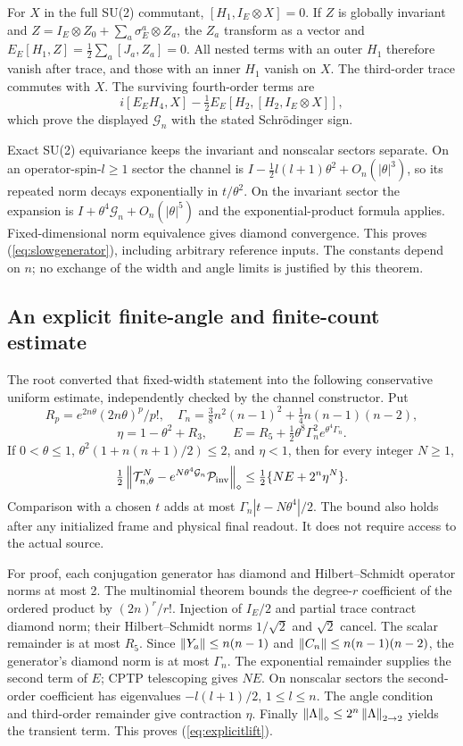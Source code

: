 For $X$ in the full SU(2) commutant, $[H_1,I_E\otimes X]=0$. If $Z$ is
globally invariant and $Z=I_E\otimes Z_0+\sum_a\sigma_E^a\otimes Z_a$,
the $Z_a$ transform as a vector and
$E_E[H_1,Z]=\tfrac12\sum_a[J_a,Z_a]=0$.
All nested terms with an outer $H_1$ therefore vanish after trace, and
those with an inner $H_1$ vanish on $X$. The third-order trace commutes with
$X$. The surviving fourth-order terms are
\[
 i[E_EH_4,X]-\tfrac12E_E[H_2,[H_2,I_E\otimes X]],
\]
which prove the displayed $\mathcal G_n$ with the stated Schr\"odinger sign.

Exact SU(2) equivariance keeps the invariant and nonscalar sectors separate.
On an operator-spin-$l\ge1$ sector the channel is
$I-\tfrac12l(l+1)\theta^2+O_n(|\theta|^3)$, so its repeated norm decays
exponentially in $t/\theta^2$. On the invariant sector the expansion is
$I+\theta^4\mathcal G_n+O_n(|\theta|^5)$ and the exponential-product
formula applies. Fixed-dimensional norm equivalence gives diamond convergence.
This proves (\ref{eq:slowgenerator}), including arbitrary reference inputs.
The constants depend on $n$; no exchange of the width and angle limits is
justified by this theorem.

\subsection{An explicit finite-angle and finite-count estimate}
The root converted that fixed-width statement into the following conservative
uniform estimate, independently checked by the channel constructor. Put
\[
 R_p=e^{2n\theta}(2n\theta)^p/p!,\quad
 \Gamma_n=\tfrac38n^2(n-1)^2+\tfrac14n(n-1)(n-2),
\]
\[
 \eta=1-\theta^2+R_3,\qquad
 E=R_5+\tfrac12\theta^8\Gamma_n^2e^{\theta^4\Gamma_n}.
\]
If $0<\theta\le1$, $\theta^2(1+n(n+1)/2)\le2$, and $\eta<1$, then for every
integer $N\ge1$,
\begin{equation}
 \tfrac12\left\lVert\mathcal T_{n,\theta}^N-
 e^{N\theta^4\mathcal G_n}\mathcal P_{\rm inv}\right\rVert_\diamond
 \le\tfrac12\{NE+2^n\eta^N\}.\label{eq:explicitlift}
\end{equation}
Comparison with a chosen $t$ adds at most
$\Gamma_n|t-N\theta^4|/2$. The bound also holds after any initialized frame
and physical final readout. It does not require access to the actual source.

For proof, each conjugation generator has diamond and Hilbert--Schmidt
operator norms at most 2. The multinomial theorem bounds the degree-$r$
coefficient of the ordered product by $(2n)^r/r!$. Injection of $I_E/2$
and partial trace contract diamond norm; their Hilbert--Schmidt norms
$1/\sqrt2$ and $\sqrt2$ cancel. The scalar remainder is at most $R_5$.
Since $\left\lVert Y_a\right\rVert\le n(n-1)$ and
$\left\lVert C_n\right\rVert\le n(n-1)(n-2)$, the generator's diamond norm is at most
$\Gamma_n$. The exponential remainder supplies the second term of $E$;
CPTP telescoping gives $NE$. On nonscalar sectors the second-order
coefficient has eigenvalues $-l(l+1)/2$, $1\le l\le n$.
The angle condition and third-order remainder give contraction $\eta$.
Finally $\left\lVert\Lambda\right\rVert_\diamond\le2^n\left\lVert\Lambda\right\rVert_{2\to2}$ yields
the transient term. This proves (\ref{eq:explicitlift}).

